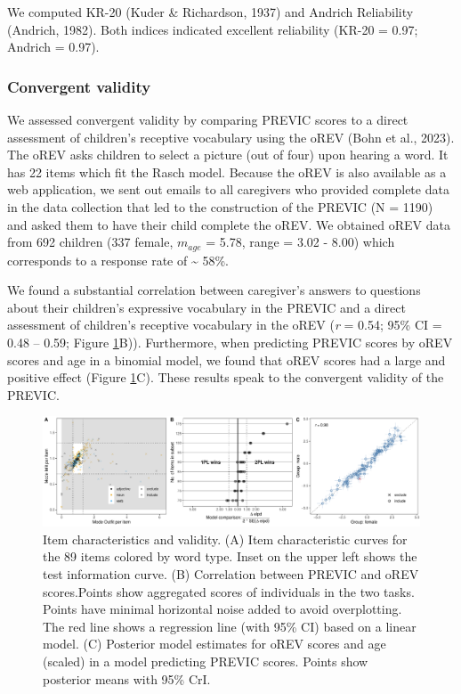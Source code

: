 \documentclass[
  man,floatsintext]{apa6}
\begin{document}
We computed KR-20 (Kuder \& Richardson, 1937) and Andrich Reliability (Andrich, 1982). Both indices indicated excellent reliability (KR-20 = 0.97; Andrich = 0.97).

\hypertarget{convergent-validity}{%
\subsubsection{Convergent validity}\label{convergent-validity}}

We assessed convergent validity by comparing PREVIC scores to a direct assessment of children's receptive vocabulary using the oREV (Bohn et al., 2023). The oREV asks children to select a picture (out of four) upon hearing a word. It has 22 items which fit the Rasch model. Because the oREV is also available as a web application, we sent out emails to all caregivers who provided complete data in the data collection that led to the construction of the PREVIC (N = 1190) and asked them to have their child complete the oREV. We obtained oREV data from 692 children (337 female, \(m_{age}\) = 5.78, range = 3.02 - 8.00) which corresponds to a response rate of \textasciitilde{} 58\%.

We found a substantial correlation between caregiver's answers to questions about their children's expressive vocabulary in the PREVIC and a direct assessment of children's receptive vocabulary in the oREV (\emph{r} = 0.54; 95\% CI = 0.48 -- 0.59; Figure \ref{fig:fig4}B)). Furthermore, when predicting PREVIC scores by oREV scores and age in a binomial model, we found that oREV scores had a large and positive effect (Figure \ref{fig:fig4}C). These results speak to the convergent validity of the PREVIC.



\begin{figure}

{\centering \includegraphics[width=1\linewidth]{../graphs/fig4} 

}

\caption{Item characteristics and validity. (A) Item characteristic curves for the 89 items colored by word type. Inset on the upper left shows the test information curve. (B) Correlation between PREVIC and oREV scores.Points show aggregated scores of individuals in the two tasks. Points have minimal horizontal noise added to avoid overplotting. The red line shows a regression line (with 95\% CI) based on a linear model. (C) Posterior model estimates for oREV scores and age (scaled) in a model predicting PREVIC scores. Points show posterior means with 95\% CrI.}\label{fig:fig4}
\end{figure}
\end{document}
